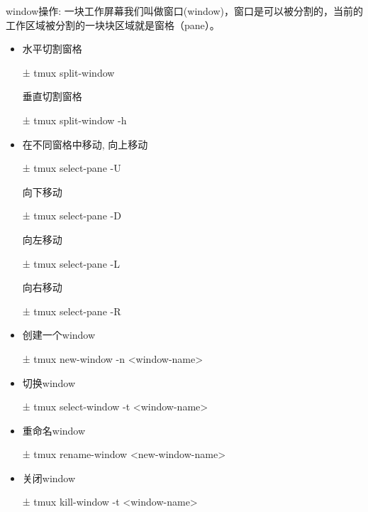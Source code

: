 window操作:
一块工作屏幕我们叫做窗口(window)，窗口是可以被分割的，当前的工作区域被分割的一块块区域就是窗格（pane）。
\begin{itemize}
\item 水平切割窗格
\begin{commandbox}
± tmux split-window 
\end{commandbox}
垂直切割窗格
\begin{commandbox}
± tmux split-window -h
\end{commandbox}

\item 在不同窗格中移动, 向上移动
\begin{commandbox}
± tmux select-pane  -U
\end{commandbox}
向下移动
\begin{commandbox}
± tmux select-pane  -D
\end{commandbox}
向左移动
\begin{commandbox}
± tmux select-pane  -L
\end{commandbox}
向右移动
\begin{commandbox}
± tmux select-pane  -R
\end{commandbox}


\item 创建一个window
\begin{commandbox}
± tmux new-window -n <window-name>
\end{commandbox}

\item 切换window
\begin{commandbox}
± tmux select-window -t <window-name>
\end{commandbox}

\item 重命名window
\begin{commandbox}
± tmux rename-window <new-window-name>
\end{commandbox}

\item 关闭window
\begin{commandbox}
± tmux kill-window -t <window-name>
\end{commandbox}

\end{itemize}

